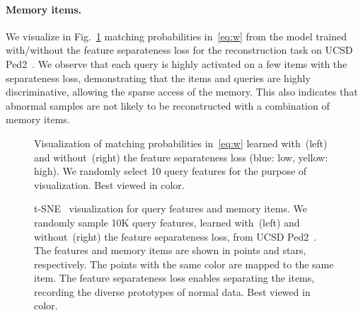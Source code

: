 \documentclass[10pt,twocolumn,letterpaper]{article}
\begin{document}
\vspace{-0.5cm}		
		\paragraph{Memory items.}
We visualize in Fig.~\ref{fig:Confusion} matching probabilities in~\eqref{eq:w} from the model trained with/without the feature separateness loss for the reconstruction task on UCSD Ped2~\cite{li2013anomaly}. We observe that each query is highly activated on a few items with the separateness loss, demonstrating that the items and queries are highly discriminative, allowing the sparse access of the memory. This also indicates that abnormal samples are not likely to be reconstructed with a combination of memory items.







    

		\begin{figure}
  			\centering
  			\renewcommand*{\thesubfigure}{}
  			\hspace{-0.2cm}
		\vspace{-0.4cm}
			\caption{Visualization of matching probabilities in~\eqref{eq:w} learned with~(left) and without~(right) the feature separateness loss (blue: low, yellow: high). We randomly select 10 query features for the purpose of visualization. Best viewed in color.}
			\label{fig:Confusion}
		\vspace{-0.3cm}
		\end{figure}
		

     \begin{figure}[t]
		\centering
		\renewcommand*{\thesubfigure}{}
  			\hspace{-0.1cm}
			\hspace{-0.1cm}
		\vspace{-0.3cm}
		\caption{t-SNE~\cite{van2014accelerating} visualization for query features and memory items. We randomly sample 10K query features, learned with~(left) and without~(right) the feature separateness loss, from UCSD Ped2~\cite{li2013anomaly}. The features and memory items are shown in points and stars, respectively. The points with the same color are mapped to the same item. The feature separateness loss enables separating the items, recording the diverse prototypes of normal data. Best viewed in color.}
		\vspace{-0.4cm}
		\label{fig:tSNE}
    \end{figure}
    
\end{document}
